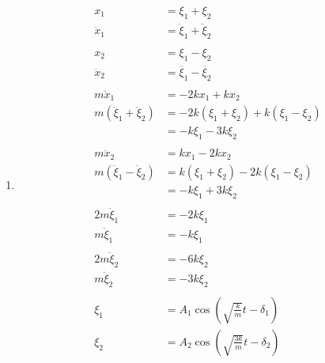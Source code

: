 \documentclass{article}
\begin{document}
\begin{enumerate}
  \item

        \begin{align*}
          x_1                             & = \xi_1 + \xi_2                                             \\
          \ddot{x}_1                      & = \ddot{\xi}_1 + \ddot{\xi}_2                               \\ \\
          x_2                             & = \xi_1 - \xi_2                                             \\
          \ddot{x}_2                      & = \ddot{\xi_1} - \ddot{\xi_2}                               \\ \\
          m \ddot{x}_1                    & = -2 k x_1 + k x_2                                          \\
          m (\ddot{\xi}_1 + \ddot{\xi}_2) & = -2 k (\xi_1 + \xi_2) + k (\xi_1 - \xi_2)                  \\
                                          & = -k \xi_1 - 3 k \xi_2                                      \\ \\
          m \ddot{x}_2                    & = k x_1 - 2 k x_2                                           \\
          m (\ddot{\xi}_1 - \ddot{\xi}_2) & = k (\xi_1 + \xi_2) - 2 k (\xi_1 - \xi_2)                   \\
                                          & = -k \xi_1 + 3 k \xi_2                                      \\ \\
          2 m \ddot{\xi}_1                & = -2 k \xi_1                                                \\
          m \ddot{\xi}_1                  & = -k \xi_1                                                  \\ \\
          2 m \ddot{\xi}_2                & = -6 k \xi_2                                                \\
          m \ddot{\xi}_2                  & = -3 k \xi_2                                                \\ \\
          \xi_1                           & = A_1 \cos \left( \sqrt{\frac{k}{m}} t - \delta_1 \right)   \\
          \xi_2                           & = A_2 \cos \left( \sqrt{\frac{3 k}{m}} t - \delta_2 \right) \\ \\
        \end{align*}
\end{enumerate}
\end{document}

